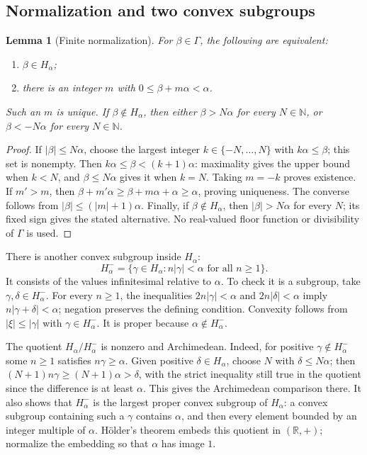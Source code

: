 \documentclass[11pt,letterpaper]{article}
\newtheorem{lemma}[lemma]{Lemma}
\theoremstyle{definition}
\newcommand{\R}{\mathbb R}
\newcommand{\N}{\mathbb N}
\begin{document}
\subsection{Normalization and two convex subgroups}

\begin{lemma}[Finite normalization]\label{tate:lem:normalize}
For $\beta\in\Gamma$, the following are equivalent:
\begin{enumerate}[label=(\roman*)]
\item $\beta\in H_\alpha$;
\item there is an integer $m$ with $0\le\beta+m\alpha<\alpha$.
\end{enumerate}
Such an $m$ is unique. If $\beta\notin H_\alpha$, then either
$\beta>N\alpha$ for every $N\in\N$, or $\beta<-N\alpha$ for every
$N\in\N$.
\end{lemma}

\begin{proof}
If $|\beta|\le N\alpha$, choose the largest integer
$k\in\{-N,\ldots,N\}$ with $k\alpha\le\beta$; this set is nonempty.
Then $k\alpha\le\beta<(k+1)\alpha$: maximality gives the upper bound
when $k<N$, and $\beta\le N\alpha$ gives it when $k=N$.
Taking $m=-k$ proves existence. If $m'>m$, then
$\beta+m'\alpha\ge\beta+m\alpha+\alpha\ge\alpha$, proving uniqueness.
The converse follows from $|\beta|\le(|m|+1)\alpha$.
Finally, if $\beta\notin H_\alpha$, then $|\beta|>N\alpha$ for every
$N$; its fixed sign gives the stated alternative. No real-valued
floor function or divisibility of $\Gamma$ is used.
\end{proof}

There is another convex subgroup inside $H_\alpha$:
\begin{equation}
 H_\alpha^-=
 \{\gamma\in H_\alpha:n|\gamma|<\alpha\text{ for all }n\ge1\}.
 \label{tate:eq:Hminus}
\end{equation}
It consists of the values infinitesimal relative to $\alpha$.
To check it is a subgroup, take $\gamma,\delta\in H_\alpha^-$.
For every $n\ge1$, the inequalities $2n|\gamma|<\alpha$ and
$2n|\delta|<\alpha$ imply $n|\gamma+\delta|<\alpha$; negation
preserves the defining condition. Convexity follows from
$|\xi|\le|\gamma|$ with $\gamma\in H_\alpha^-$.
It is proper because $\alpha\notin H_\alpha^-$.

The quotient $H_\alpha/H_\alpha^-$ is nonzero and Archimedean.
Indeed, for positive $\gamma\notin H_\alpha^-$ some $n\ge1$
satisfies $n\gamma\ge\alpha$. Given positive $\delta\in H_\alpha$,
choose $N$ with $\delta\le N\alpha$; then
$(N+1)n\gamma\ge(N+1)\alpha>\delta$, with the strict inequality
still true in the quotient since the difference is at least $\alpha$.
This gives the Archimedean comparison there. It also shows that
$H_\alpha^-$ is the largest proper convex subgroup of $H_\alpha$:
a convex subgroup containing such a $\gamma$ contains $\alpha$,
and then every element bounded by an integer multiple of $\alpha$. H\"older's theorem embeds this quotient in $(\R,+)$; normalize
the embedding so that $\alpha$ has image $1$.
\end{document}
